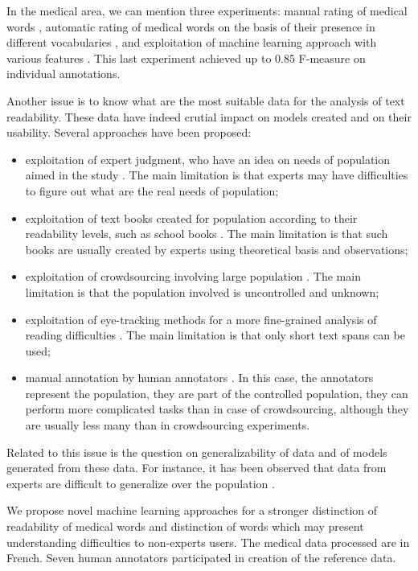 In the medical area, we can mention three experiments: manual rating
of medical words \citep{Zheng-AMIA2002}, automatic rating of medical
words on the basis of their presence in different vocabularies
\citep{Borst-MIE2008}, and exploitation of machine learning approach
with various features \citep{Grabar-PITR2014}. This last experiment
achieved up to 0.85 F-measure on individual annotations.

Another issue is to know what are the most suitable data for the
analysis of text readability. These data have indeed crutial impact on
models created and on their usability.  Several approaches have been
proposed:
\begin{itemize}
\item exploitation of expert judgment, who have an idea on needs of
  population aimed in the study \citep{DeClerc-NLE2014}. The main
  limitation is that experts may have difficulties to figure out what
  are the real needs of population;
\item exploitation of text books created for population according to
  their readability levels, such as school books
  \citep{Gala-ELEX2013}. The main limitation is that such books are
  usually created by experts using theoretical basis and observations;
\item exploitation of crowdsourcing involving large population
  \citep{DeClerc-NLE2014}.  The main limitation is that the
  population involved is uncontrolled and unknown;
\item exploitation of eye-tracking methods for a more fine-grained
  analysis of reading difficulties
  \citep{Yaneva-CCA2015,Grabar-ICHI2018}.  The main limitation is that
  only short text spans can be used;
\item manual annotation by human annotators
  \citep{Grabar-LREC2016t}. In this case, the annotators represent the
  population, they are part of the controlled population, they can
  perform more complicated tasks than in case of crowdsourcing,
  although they are usually less many than in crowdsourcing
  experiments.
\end{itemize}
Related to this issue is the question on generalizability of data and
of models generated from these data.  For instance, it has been
observed that data from experts are difficult to generalize over the
population \citep{DeClerc-NLE2014}.

We propose novel machine learning approaches for a stronger distinction of readability of medical words and distinction of words which may present understanding difficulties to non-experts users. The medical data processed are in French. Seven human annotators participated in creation of the reference data.
